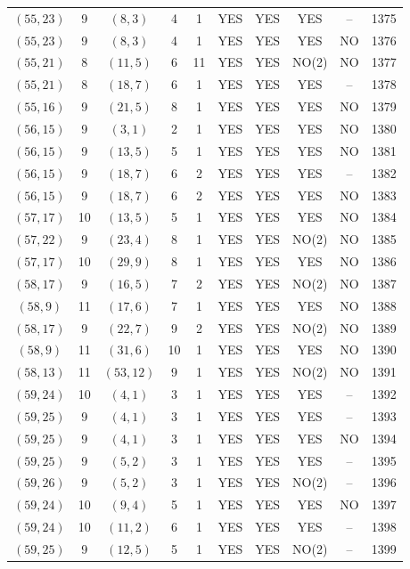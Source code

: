 \begin{longtable}{|c|c|c|c|c|c|c|c|c|c|}
$(55, 23)$ & 9 & $(8, 3)$ & 4 & 1 & YES & YES & YES & -- & 1375\\
$(55, 23)$ & 9 & $(8, 3)$ & 4 & 1 & YES & YES & YES & NO & 1376\\
$(55, 21)$ & 8 & $(11, 5)$ & 6 & 11 & YES & YES & NO(2) & NO & 1377\\
$(55, 21)$ & 8 & $(18, 7)$ & 6 & 1 & YES & YES & YES & -- & 1378\\
$(55, 16)$ & 9 & $(21, 5)$ & 8 & 1 & YES & YES & YES & NO & 1379\\
$(56, 15)$ & 9 & $(3, 1)$ & 2 & 1 & YES & YES & YES & NO & 1380\\
$(56, 15)$ & 9 & $(13, 5)$ & 5 & 1 & YES & YES & YES & NO & 1381\\
$(56, 15)$ & 9 & $(18, 7)$ & 6 & 2 & YES & YES & YES & -- & 1382\\
$(56, 15)$ & 9 & $(18, 7)$ & 6 & 2 & YES & YES & YES & NO & 1383\\
$(57, 17)$ & 10 & $(13, 5)$ & 5 & 1 & YES & YES & YES & NO & 1384\\
$(57, 22)$ & 9 & $(23, 4)$ & 8 & 1 & YES & YES & NO(2) & NO & 1385\\
$(57, 17)$ & 10 & $(29, 9)$ & 8 & 1 & YES & YES & YES & NO & 1386\\
$(58, 17)$ & 9 & $(16, 5)$ & 7 & 2 & YES & YES & NO(2) & NO & 1387\\
$(58, 9)$ & 11 & $(17, 6)$ & 7 & 1 & YES & YES & YES & NO & 1388\\
$(58, 17)$ & 9 & $(22, 7)$ & 9 & 2 & YES & YES & NO(2) & NO & 1389\\
$(58, 9)$ & 11 & $(31, 6)$ & 10 & 1 & YES & YES & YES & NO & 1390\\
$(58, 13)$ & 11 & $(53, 12)$ & 9 & 1 & YES & YES & NO(2) & NO & 1391\\
$(59, 24)$ & 10 & $(4, 1)$ & 3 & 1 & YES & YES & YES & -- & 1392\\
$(59, 25)$ & 9 & $(4, 1)$ & 3 & 1 & YES & YES & YES & -- & 1393\\
$(59, 25)$ & 9 & $(4, 1)$ & 3 & 1 & YES & YES & YES & NO & 1394\\
$(59, 25)$ & 9 & $(5, 2)$ & 3 & 1 & YES & YES & YES & -- & 1395\\
$(59, 26)$ & 9 & $(5, 2)$ & 3 & 1 & YES & YES & NO(2) & -- & 1396\\
$(59, 24)$ & 10 & $(9, 4)$ & 5 & 1 & YES & YES & YES & NO & 1397\\
$(59, 24)$ & 10 & $(11, 2)$ & 6 & 1 & YES & YES & YES & -- & 1398\\
$(59, 25)$ & 9 & $(12, 5)$ & 5 & 1 & YES & YES & NO(2) & -- & 1399\\

\end{longtable}
